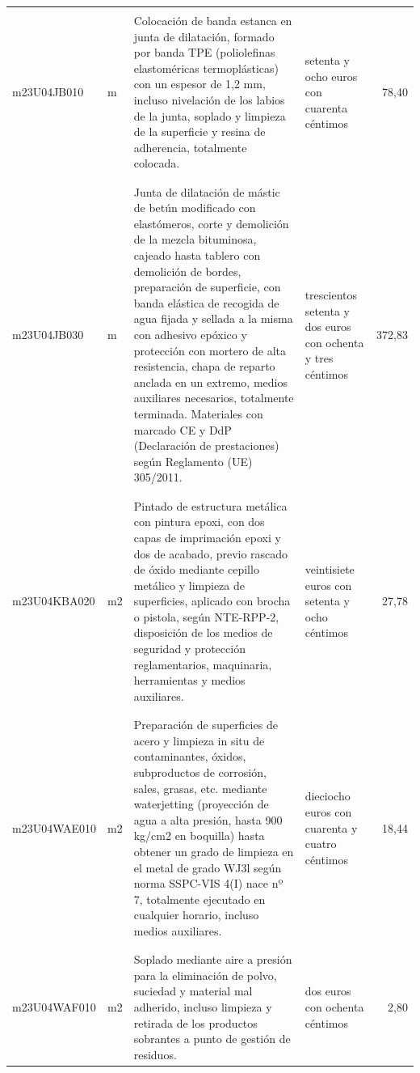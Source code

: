 \begin{supertabular}{|l|l|p{5cm}|p{3cm}|r|}
&&&&\\%
m23U04JB010&m&Colocación de banda estanca en junta de dilatación, formado por banda TPE (poliolefinas elastoméricas termoplásticas) con un espesor de 1,2 mm, incluso nivelación de los labios de la junta, soplado y limpieza de la superficie y resina de adherencia, totalmente colocada.&setenta y ocho euros con cuarenta céntimos&78,40\\%
&&&&\\%
&&&&\\%
m23U04JB030&m&Junta de dilatación de mástic de betún modificado con elastómeros, corte y demolición de la mezcla bituminosa, cajeado hasta tablero con demolición de bordes, preparación de superficie, con banda elástica de recogida de agua fijada y sellada a la misma con adhesivo epóxico y protección con mortero de alta resistencia, chapa de reparto anclada en un extremo, medios auxiliares necesarios, totalmente terminada. Materiales con marcado CE y DdP (Declaración de prestaciones) según Reglamento (UE) 305/2011.&trescientos setenta y dos euros con ochenta y tres céntimos&372,83\\%
&&&&\\%
&&&&\\%
m23U04KBA020&m2&Pintado de estructura metálica con pintura epoxi, con dos capas de imprimación epoxi y dos de acabado, previo rascado de óxido mediante cepillo metálico y limpieza de superficies, aplicado con brocha o pistola, según NTE{-}RPP{-}2, disposición de los medios de seguridad y protección reglamentarios, maquinaria, herramientas y medios auxiliares.&veintisiete euros con setenta y ocho céntimos&27,78\\%
&&&&\\%
&&&&\\%
m23U04WAE010&m2&Preparación de superficies de acero y limpieza in situ de contaminantes, óxidos, subproductos de corrosión, sales, grasas, etc. mediante waterjetting (proyección de agua a alta presión, hasta 900 kg/cm2 en boquilla) hasta obtener un grado de limpieza en el metal de grado WJ3l según norma SSPC{-}VIS 4(I) nace nº 7, totalmente ejecutado en cualquier horario, incluso medios auxiliares.&dieciocho euros con cuarenta y cuatro céntimos&18,44\\%
&&&&\\%
&&&&\\%
m23U04WAF010&m2&Soplado mediante aire a presión para la eliminación de polvo, suciedad y material mal adherido, incluso limpieza y retirada de los productos sobrantes a punto de gestión de residuos.&dos euros con ochenta céntimos&2,80\\%

\end{supertabular}
